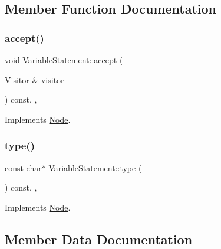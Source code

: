 \subsection{Member Function Documentation}
\mbox{\label{struct_variable_statement_a55446c8cfa8fd620de4b72f7efca86bd}} 
\subsubsection{\texorpdfstring{accept()}{accept()}}
{\footnotesize\ttfamily void Variable\+Statement\+::accept (\begin{DoxyParamCaption}\item[{\hyperlink{struct_visitor}{Visitor} \&}]{visitor }\end{DoxyParamCaption}) const\hspace{0.3cm}{\ttfamily [inline]}, {\ttfamily [override]}, {\ttfamily [virtual]}}



Implements \hyperlink{struct_node_a10bd7af968140bbf5fa461298a969c71}{Node}.

\mbox{\label{struct_variable_statement_ae3097fcbff760d955e04d84ddb111214}} 
\subsubsection{\texorpdfstring{type()}{type()}}
{\footnotesize\ttfamily const char$\ast$ Variable\+Statement\+::type (\begin{DoxyParamCaption}{ }\end{DoxyParamCaption}) const\hspace{0.3cm}{\ttfamily [inline]}, {\ttfamily [override]}, {\ttfamily [virtual]}}



Implements \hyperlink{struct_node_a82f29420d0a38efcc370352528e94e9b}{Node}.



\subsection{Member Data Documentation}
\mbox{\label{struct_variable_statement_a9d1cdb228d5cb079e228180532cec942}} 

